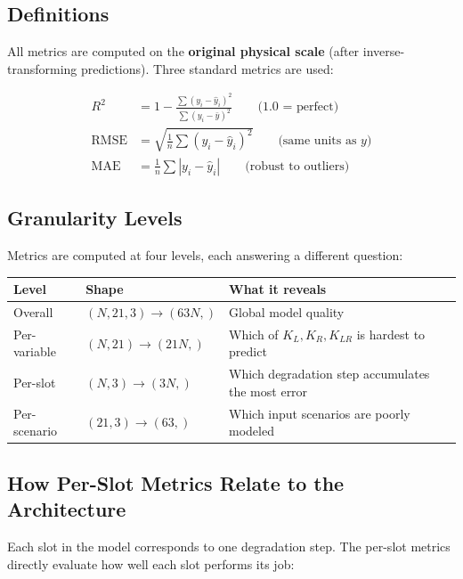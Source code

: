 \documentclass[11pt,a4paper]{article}
\begin{document}
\subsection{Definitions}

All metrics are computed on the \textbf{original physical scale} (after inverse-transforming predictions). Three standard metrics are used:

\begin{align}
    R^2 &= 1 - \frac{\sum(y_i - \hat{y}_i)^2}{\sum(y_i - \bar{y})^2} \qquad \text{(1.0 = perfect)} \\[4pt]
    \text{RMSE} &= \sqrt{\frac{1}{n}\sum(y_i - \hat{y}_i)^2} \qquad \text{(same units as $y$)} \\[4pt]
    \text{MAE} &= \frac{1}{n}\sum|y_i - \hat{y}_i| \qquad \text{(robust to outliers)}
\end{align}

\subsection{Granularity Levels}

Metrics are computed at four levels, each answering a different question:

\begin{center}
\small
\begin{tabular}{@{}llp{6.5cm}@{}}
\toprule
\textbf{Level} & \textbf{Shape} & \textbf{What it reveals} \\
\midrule
Overall & $(N, 21, 3) \to (63N,)$ & Global model quality \\
Per-variable & $(N, 21) \to (21N,)$ & Which of $K_L, K_R, K_{LR}$ is hardest to predict \\
Per-slot & $(N, 3) \to (3N,)$ & Which degradation step accumulates the most error \\
Per-scenario & $(21, 3) \to (63,)$ & Which input scenarios are poorly modeled \\
\bottomrule
\end{tabular}
\end{center}

\subsection{How Per-Slot Metrics Relate to the Architecture}

Each slot in the model corresponds to one degradation step. The per-slot metrics directly evaluate how well each slot performs its job:
\end{document}
